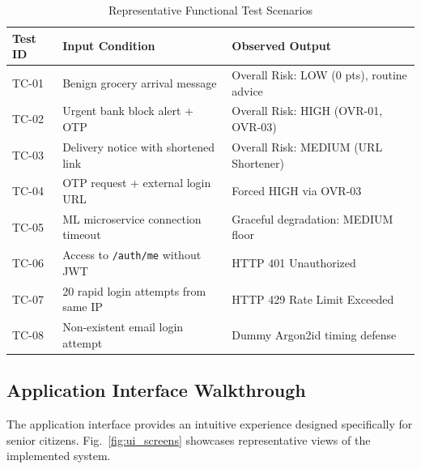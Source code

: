 \documentclass[conference]{IEEEtran}
\providecommand{\toprule}{\hline\hline}
\providecommand{\midrule}{\hline}
\providecommand{\bottomrule}{\hline\hline}
\begin{document}
\begin{table}[h]
\caption{Representative Functional Test Scenarios}
\label{tab:test_cases}
\centering
\small
\begin{tabular}{p{1.2cm}p{3.2cm}p{2.8cm}}
\toprule
\textbf{Test ID} & \textbf{Input Condition} & \textbf{Observed Output} \\
\midrule
TC-01 & Benign grocery arrival message & Overall Risk: LOW (0 pts), routine advice \\
TC-02 & Urgent bank block alert + OTP & Overall Risk: HIGH (OVR-01, OVR-03) \\
TC-03 & Delivery notice with shortened link & Overall Risk: MEDIUM (URL Shortener) \\
TC-04 & OTP request + external login URL & Forced HIGH via OVR-03 \\
TC-05 & ML microservice connection timeout & Graceful degradation: MEDIUM floor \\
TC-06 & Access to \texttt{/auth/me} without JWT & HTTP 401 Unauthorized \\
TC-07 & 20 rapid login attempts from same IP & HTTP 429 Rate Limit Exceeded \\
TC-08 & Non-existent email login attempt & Dummy Argon2id timing defense \\
\bottomrule
\end{tabular}
\end{table}

\subsection{Application Interface Walkthrough}
The application interface provides an intuitive experience designed specifically for senior citizens. Fig.~\ref{fig:ui_screens} showcases representative views of the implemented system.
\end{document}
